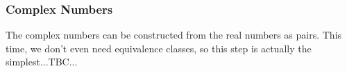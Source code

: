 



\subsubsection{Complex Numbers} The complex numbers can be constructed from the real numbers as pairs. This time, we don't even need equivalence classes, so this step is actually the simplest...TBC...








